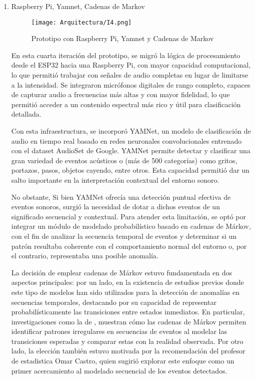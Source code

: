 \begin{enumerate}
      \item Raspberry Pi, Yamnet, Cadenas de Markov

            \begin{figure}[ht!]
                  \centering
                  \texttt{[image: Arquitectura/I4.png]}
                  \caption{Prototipo con Raspberry Pi, Yamnet y Cadenas de Markov}
                  \label{fig:prototipo4}
            \end{figure}

            En esta cuarta iteración del prototipo, se migró la lógica de procesamiento desde el ESP32 hacia una Raspberry Pi, con mayor capacidad computacional, lo que permitió trabajar con señales de audio completas en lugar de limitarse a la intensidad. Se integraron micrófonos digitales de rango completo, capaces de capturar audio a frecuencias más altas y con mayor fidelidad, lo que permitió acceder a un contenido espectral más rico y útil para clasificación detallada.

            Con esta infraestructura, se incorporó YAMNet, un modelo de clasificación de audio en tiempo real basado en redes neuronales convolucionales entrenado con el dataset AudioSet de Google. YAMNet permite detectar y clasificar una gran variedad de eventos acústicos o (más de 500 categorías) como gritos, portazos, pasos, objetos cayendo, entre otros. Esta capacidad permitió dar un salto importante en la interpretación contextual del entorno sonoro.

            No obstante, Si bien YAMNet ofrecía una detección puntual efectiva de eventos sonoros, surgió la necesidad de dotar a dichos eventos de un significado secuencial y contextual. Para atender esta limitación, se optó por integrar un módulo de modelado probabilístico basado en cadenas de Márkov, con el fin de analizar la secuencia temporal de eventos y determinar si un patrón resultaba coherente con el comportamiento normal del entorno o, por el contrario, representaba una posible anomalía.

            La decisión de emplear cadenas de Márkov estuvo fundamentada en dos aspectos principales: por un lado, en la existencia de estudios previos donde este tipo de modelos han sido utilizados para la detección de anomalías en secuencias temporales, destacando por su capacidad de representar probabilísticamente las transiciones entre estados inmediatos. En particular, investigaciones como la de \citeauthor{boldt2020anomaly} \citeyear{boldt2020anomaly}, muestran cómo las cadenas de Márkov permiten identificar patrones irregulares en secuencias de eventos al modelar las transiciones esperadas y comparar estas con la realidad observada. Por otro lado, la elección también estuvo motivada por la recomendación del profesor de estadistica Omar Castro, quien sugirió explorar este enfoque como un primer acercamiento al modelado secuencial de los eventos detectados.


\end{enumerate}
